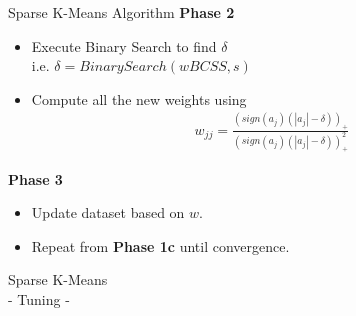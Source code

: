 \documentclass{beamer}
\newlength{\tmpShadow}
\newcommand{\MyShadow}[2]{%
	\settowidth{\tmpShadow}{#1}
	\addtolength{\tmpShadow}{.1em}
	\raisebox{-0.25ex}{\textcolor{gray!70}{#1}}%
	\kern-\tmpShadow%
	\textcolor{#2}{#1}%
}
\begin{document}
{\begin{frame}{Sparse K-Means Algorithm}
	\textbf{Phase 2}\\
	\begin{itemize}[label={\MyShadow{$\bullet$}{blue!80}}]
		\item Execute Binary Search to find $\delta$\\i.e. $\delta = BinarySearch(wBCSS,s)$
		\vspace{3mm}
		\item Compute all the new weights using
			\begin{align}\nonumber
				w_{jj} = \frac{(sign(a_{j})(|a_{j}|-\delta))_+}{(sign(a_{j})(|a_{j}|-\delta))^2_+}
			\end{align}	
	\end{itemize}
	\textbf{Phase 3}\\
	\begin{itemize}[label={\MyShadow{$\bullet$}{blue!80}}]
		\item Update dataset based on $w$.
		\vspace{3mm}
		\item Repeat from \textbf{Phase 1c} until convergence.	
	\end{itemize}	
\end{frame}

\begin{frame}[plain,c]
	\begin{center}
		\Huge Sparse K-Means\\
		\Huge - Tuning -
	\end{center}
\end{frame}

}
\end{document}
